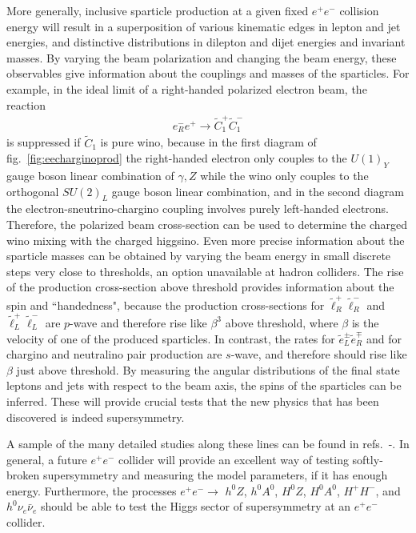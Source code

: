 \documentclass[12pt]{article}
\def\beq{\begin{eqnarray}}
\def\eeq{\end{eqnarray}}
\def\stilde{\widetilde}
\begin{document}
More generally, inclusive sparticle production at a given fixed $e^+e^-$ 
collision energy will result in a superposition of various kinematic 
edges in lepton and jet energies, and distinctive distributions in 
dilepton and dijet energies and invariant masses. By varying the beam 
polarization and changing the beam energy, these observables give 
information about the couplings and masses of the sparticles. For example, 
in the ideal limit of a right-handed polarized electron beam, the reaction
\beq
e^-_R e^+ \rightarrow \stilde C_1^+ \stilde C_1^-
\eeq
is suppressed if $\stilde C_1$ is pure wino, because in the first diagram 
of fig.~\ref{fig:eecharginoprod} the right-handed electron only couples to 
the $U(1)_Y$ gauge boson linear combination of $\gamma,Z$ while the wino 
only couples to the orthogonal $SU(2)_L$ gauge boson linear combination, 
and in the second diagram the electron-sneutrino-chargino coupling 
involves purely left-handed electrons. Therefore, the polarized beam 
cross-section can be used to determine the charged wino mixing with the 
charged higgsino. Even more precise information about the sparticle masses 
can be obtained by varying the beam energy in small discrete steps very 
close to thresholds, an option unavailable at hadron colliders. The rise 
of the production cross-section above threshold provides information about 
the spin and ``handedness", because the production cross-sections for 
$\tilde \ell_R^+ \tilde \ell_R^-$ and $\tilde \ell_L^+ \tilde \ell_L^-$ 
are $p$-wave and therefore rise like $\beta^3$ above threshold, where 
$\beta$ is the velocity of one of the produced sparticles. In contrast, 
the rates for $\tilde e_L^\pm \tilde e_R^\mp$ and for chargino and 
neutralino pair production are $s$-wave, and therefore should rise like 
$\beta$ just above threshold.  By measuring the angular distributions of 
the final state leptons and jets with respect to the beam axis, the spins 
of the sparticles can be inferred. These will provide crucial tests that 
the new physics that has been discovered is indeed supersymmetry.

A sample of the many detailed studies along these lines can be found in 
refs.~\cite{ilcmassdetrefs}-\cite{ALC}. 
In general, a future
$e^+ e^-$ collider will provide an excellent way of testing softly-broken 
supersymmetry and measuring the model parameters, if it has enough energy. 
Furthermore, the processes $e^+e^- \rightarrow$ $h^0Z$, $h^0A^0$, $H^0Z$, 
$H^0A^0$, $H^+H^-$, and $h^0 \nu_e \bar \nu_e$ should be able to 
test the Higgs sector of supersymmetry at an $e^+e^-$ collider.
\end{document}
